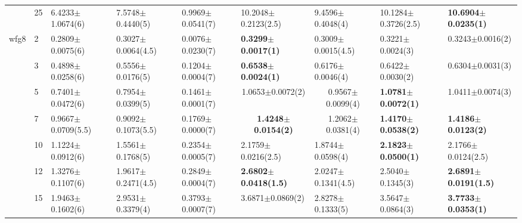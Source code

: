 \begin{table*}[]
\begin{adjustbox}{width=1.0\textwidth,center}
\begin{tabular}{lllllllll}
      & 25                             & 6.4233$\pm$1.0674(6)         & 7.5748$\pm$0.4440(5)          & 0.9969$\pm$0.0541(7)              & 10.2048$\pm$0.2123(2.5)                           & 9.4596$\pm$0.4048(4)                     & 10.1284$\pm$0.3726(2.5)                    & \textbf{10.6904$\pm$0.0235(1)}  \\\thickhline
wfg8  & 2                              & 0.2809$\pm$0.0075(6)         & 0.3027$\pm$0.0064(4.5)        & 0.0076$\pm$0.0230(7)              & \textbf{0.3299$\pm$0.0017(1)}                     & 0.3009$\pm$0.0015(4.5)                   & 0.3221$\pm$0.0024(3)                       & 0.3243$\pm$0.0016(2)            \\
      & 3                              & 0.4898$\pm$0.0258(6)         & 0.5556$\pm$0.0176(5)          & 0.1204$\pm$0.0004(7)              & \textbf{0.6538$\pm$0.0024(1)}                     & 0.6176$\pm$0.0046(4)                     & 0.6422$\pm$0.0030(2)                       & 0.6304$\pm$0.0031(3)            \\
      & 5                              & 0.7401$\pm$0.0472(6)         & 0.7954$\pm$0.0399(5)          & 0.1461$\pm$0.0001(7)              & \multicolumn{1}{c}{1.0653$\pm$0.0072(2)}          & \multicolumn{1}{c}{0.9567$\pm$0.0099(4)} & \textbf{1.0781$\pm$0.0072(1)}              & 1.0411$\pm$0.0074(3)            \\
      & 7                              & 0.9667$\pm$0.0709(5.5)       & 0.9092$\pm$0.1073(5.5)        & 0.1769$\pm$0.0000(7)              & \multicolumn{1}{c}{\textbf{1.4248$\pm$0.0154(2)}} & \multicolumn{1}{c}{1.2062$\pm$0.0381(4)} & \textbf{1.4170$\pm$0.0538(2)}              & \textbf{1.4186$\pm$0.0123(2)}   \\
      & 10                             & 1.1224$\pm$0.0912(6)         & 1.5561$\pm$0.1768(5)          & 0.2354$\pm$0.0005(7)              & 2.1759$\pm$0.0216(2.5)                            & 1.8744$\pm$0.0598(4)                     & \textbf{2.1823$\pm$0.0500(1)}              & 2.1766$\pm$0.0124(2.5)          \\
      & 12                             & 1.3276$\pm$0.1107(6)         & 1.9617$\pm$0.2471(4.5)        & 0.2849$\pm$0.0004(7)              & \textbf{2.6802$\pm$0.0418(1.5)}                   & 2.0247$\pm$0.1341(4.5)                   & 2.5040$\pm$0.1345(3)                       & \textbf{2.6891$\pm$0.0191(1.5)} \\
      & 15                             & 1.9463$\pm$0.1602(6)         & 2.9531$\pm$0.3379(4)          & 0.3793$\pm$0.0007(7)              & 3.6871$\pm$0.0869(2)                              & 2.8278$\pm$0.1333(5)                     & 3.5647$\pm$0.0864(3)                       & \textbf{3.7733$\pm$0.0353(1)}   \\

\end{tabular}
\end{adjustbox}
\end{table*}
